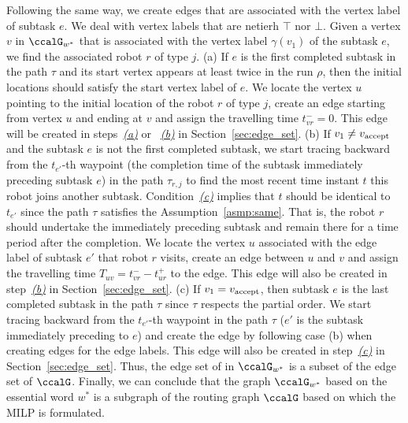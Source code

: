 \documentclass[Afour,sageh,times]{sagej}
\newcommand{\vertex}[1]{v_{\textup{#1}}}
\begin{document}
{{Following the same way, we create edges that are associated with the vertex label of subtask $e$. We deal with vertex labels that are netierh $\top$ nor $\bot$. Given a vertex $v$ in $\ccalG_{w^*}$ that is associated with the vertex label $\gamma(v_1)$ of the subtask $e$,  we find  the associated robot $r$ of type $j$. (a) If $e$ is the first completed subtask in the path $\tau$ and its start vertex appears at least twice in the run $\rho$, then the initial locations should satisfy the start vertex label of $e$. We locate the vertex $u$ pointing to the initial location of the robot $r$ of type $j$, create an edge starting from vertex $u$ and ending at $v$ and assign the travelling time $t_{vr}^-=0$. This edge will be created in steps~\hyperref[edge:vertex1]{\it (a)} or ~\hyperref[edge:vertex2]{\it (b)} in Section~\ref{sec:edge_set}.
(b) If $v_1 \neq \vertex{accept}$ and the subtask $e$ is not the first completed subtask, we start tracing backward from the $t_{e'}$-th waypoint (the completion time of the subtask immediately preceding subtask $e$) in the path $\tau_{r,j}$ to find the most recent time instant $t$ this robot joins another subtask. Condition~\hyperref[asmp:c]{\it (c)} implies that $t$ should be identical to $t_{e'}$ since the path $\tau$ satisfies the Assumption~\ref{asmp:same}. That is, the robot $r$ should undertake the immediately preceding subtask and remain there for a time period after the completion. We locate the vertex $u$ associated with the edge label of subtask $e'$ that robot $r$ visits, create an edge between $u$ and $v$ and assign the travelling time $T_{uv} = t_{vr}^- - t_{ur}^+$ to the edge. This edge will also be created in step~\hyperref[edge:vertex2]{\it (b)} in Section~\ref{sec:edge_set}. (c) If $v_1 = \vertex{accept}$, then subtask $e$ is the last completed subtask in the path $\tau$ since $\tau$ respects the partial order. We start tracing backward from the $t_{e'}$-th waypoint in the path $\tau$ ($e'$ is the subtask immediately preceding to $e$) and create the edge by following case (b) when creating edges for the edge labels. This edge will also be created in step~\hyperref[edge:vertex3]{\it (c)} in Section~\ref{sec:edge_set}. Thus, the edge set of in $\ccalG_{w^*}$ is a subset of the edge set of $\ccalG$. Finally, we can conclude that the graph $\ccalG_{w^*}$ based on the essential word $w^*$ is a subgraph of the routing graph $\ccalG$ based on which the MILP is formulated.


}}
\end{document}
